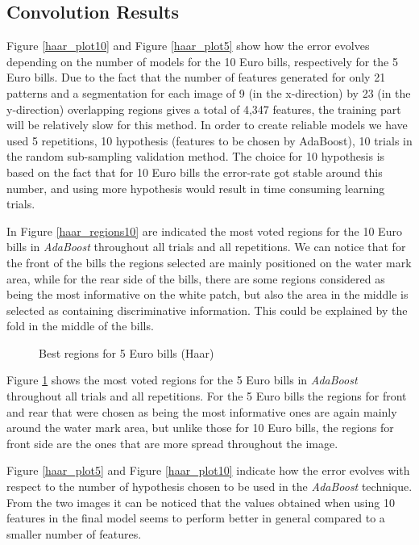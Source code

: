 \documentclass[11pt,twocolumn]{article}
\begin{document}
		\subsection{Convolution Results}\label{sec:haar_results}
		Figure \ref{haar_plot10} and Figure \ref{haar_plot5} show how the error evolves depending on the number of models for the 10 Euro bills, respectively for the 5 Euro bills. Due to the fact that the number of features generated for only 21 patterns and a segmentation for each image of 9 (in the x-direction) by 23 (in the y-direction) overlapping regions gives a total of 4,347 features, the training part will be relatively slow for this method. In order to create reliable models we have used 5 repetitions, 10 hypothesis (features to be chosen by AdaBoost), 10 trials in the random sub-sampling validation method. The choice for 10 hypothesis is based on the fact that for 10 Euro bills the error-rate got stable around this number, and using more hypothesis would result in time consuming learning trials.

		In Figure \ref{haar_regions10} are indicated the most voted regions for the 10 Euro bills in \emph{AdaBoost} throughout all trials and all repetitions. We can notice that for the front of the bills the regions selected are mainly positioned on the water mark area, while for the rear side of the bills, there are some regions considered as being the most informative on the white patch, but also the area in the middle is selected as containing discriminative information. This could be explained by the fold in the middle of the bills.

		\begin{figure}[!hbtp]
			\centering
			\caption{Best regions for 5 Euro bills (Haar)}
			\label{haar_regions5}
		\end{figure}

		Figure \ref{haar_regions5} shows the most voted regions for the 5 Euro bills in \emph{AdaBoost} throughout all trials and all repetitions. For the 5 Euro bills the regions for front and rear that were chosen as being the most informative ones are again mainly around the water mark area, but unlike those for 10 Euro bills, the regions for front side are the ones that are more spread throughout the image.

		Figure \ref{haar_plot5} and Figure \ref{haar_plot10} indicate how the error evolves with respect to the number of hypothesis chosen to be used in the \emph{AdaBoost} technique. From the two images it can be noticed that the values obtained when using 10 features in the final model seems to perform better in general compared to a smaller number of features.
\end{document}
